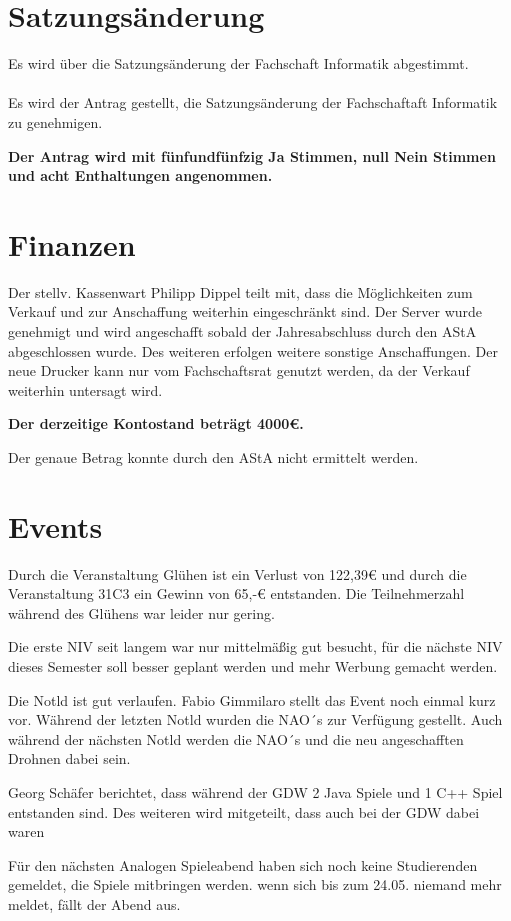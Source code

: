 \documentclass[a4paper, 11pt]{article} %
\begin{document}
\section{Satzungsänderung}
Es wird über die Satzungsänderung der Fachschaft Informatik abgestimmt.
\\\\
Es wird der Antrag gestellt, die Satzungsänderung der Fachschaftaft Informatik zu genehmigen.

\begin{center}
	\textbf{Der Antrag wird mit fünfundfünfzig Ja Stimmen, null Nein Stimmen und acht Enthaltungen angenommen.}
\end{center}
\section{Finanzen}
Der stellv. Kassenwart Philipp Dippel teilt mit, dass die Möglichkeiten zum Verkauf und zur Anschaffung weiterhin eingeschränkt sind. Der Server wurde genehmigt und wird angeschafft sobald der Jahresabschluss durch den AStA abgeschlossen wurde. Des weiteren erfolgen weitere sonstige Anschaffungen. 
Der neue Drucker kann nur vom Fachschaftsrat genutzt werden, da der Verkauf weiterhin untersagt wird.
\begin{center}
	\textbf{Der derzeitige Kontostand beträgt 4000€.}
\end{center}
Der genaue Betrag konnte durch den AStA nicht ermittelt werden.
\section{Events}
\begin{flushleft}
	Durch die Veranstaltung Glühen ist ein Verlust von 122,39€ und durch die Veranstaltung 31C3 ein Gewinn von 65,-€ entstanden. Die Teilnehmerzahl während des Glühens war leider nur gering.
	
	Die erste NIV seit langem war nur mittelmäßig gut besucht, für die nächste NIV dieses Semester soll besser geplant werden und mehr Werbung gemacht werden.
	
	Die Notld ist gut verlaufen. Fabio Gimmilaro stellt das Event noch einmal kurz vor. Während der letzten Notld wurden die NAO´s zur Verfügung gestellt. Auch während der nächsten Notld werden die NAO´s und die neu angeschafften Drohnen dabei sein.  
	
	Georg Schäfer berichtet, dass während der GDW 2 Java Spiele und 1 C++ Spiel entstanden sind. Des weiteren wird mitgeteilt, dass auch  bei der GDW dabei waren  
	
	Für den nächsten Analogen Spieleabend haben sich noch keine Studierenden gemeldet, die Spiele mitbringen werden. wenn sich bis zum 24.05. niemand mehr meldet, fällt der Abend aus.
\end{flushleft}
\end{document}
